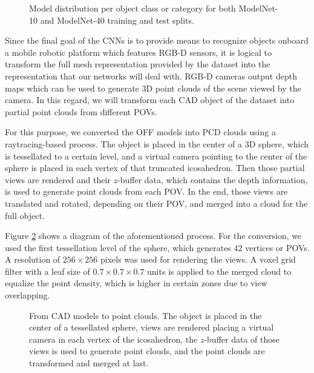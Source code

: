 \begin{figure}[!h]
    \centering
    
    \caption{Model distribution per object class or category for both ModelNet-10 and ModelNet-40 training and test splits.}
    \label{fig:objrecog:modelnet_distribution}
\end{figure}

Since the final goal of the \acp{CNN} is to provide means to recognize objects onboard a mobile robotic platform which features \ac{RGB-D} sensors, it is logical to transform the full mesh representation provided by the dataset into the representation that our networks will deal with. \ac{RGB-D} cameras output depth maps which can be used to generate \acs{3D} point clouds of the scene viewed by the camera. In this regard, we will transform each \ac{CAD} object of the dataset into partial point clouds from different \acp{POV}.

For this purpose, we converted the \ac{OFF} models into \ac{PCD} clouds using a raytracing-based process. The object is placed in the center of a \acs{3D} sphere, which is tessellated to a certain level, and a virtual camera pointing to the center of the sphere is placed in each vertex of that truncated icosahedron. Then those partial views are rendered and their $z$-buffer data, which contains the depth information, is used to generate point clouds from each \acs{POV}. In the end, those views are translated and rotated, depending on their \ac{POV}, and merged into a cloud for the full object.

Figure \ref{fig:objrecog:adapter} shows a diagram of the aforementioned process. For the conversion, we used the first tessellation level of the sphere, which generates $42$ vertices or \acp{POV}. A resolution of $256\times256$ pixels was used for rendering the views. A voxel grid filter with a leaf size of $0.7\times0.7\times0.7$ units is applied to the merged cloud to equalize the point density, which is higher in certain zones due to view overlapping.

\begin{figure}[!t]
	\centering
	\resizebox{\textwidth}{!}{
		
	}
	\caption{From \acs{CAD} models to point clouds. The object is placed in the center of a tessellated sphere, views are rendered placing a virtual camera in each vertex of the icosahedron, the $z$-buffer data of those views is used to generate point clouds, and the point clouds are transformed and merged at last.}
	\label{fig:objrecog:adapter}
\end{figure}


